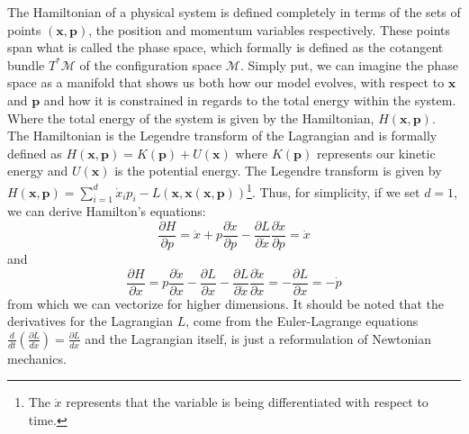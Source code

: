 \documentclass[twoside]{article}
\begin{document}
The Hamiltonian of a physical system is defined completely in terms of the sets of points $(\textbf{x}, \textbf{p})$, the position and momentum variables respectively. These points span what is called the phase space, which formally is defined as the cotangent bundle $T^{*}\mathcal{M}$ of the configuration space $\mathcal{M}$. Simply put, we can imagine the phase space as a manifold that shows us both how our model evolves, with respect to $\textbf{x}$ and $\textbf{p}$ and how it is constrained in regards to the total energy within the system. Where the total energy of the system is given by the Hamiltonian, $H(\textbf{x},\textbf{p})$. The Hamiltonian is the Legendre transform of the Lagrangian and is formally defined as $
H(\textbf{x}, \textbf{p})  = K(\textbf{p}) + U(\textbf{x})$ where $K(\textbf{p})$ represents our kinetic energy and $U(\textbf{x})$ is the potential energy. The Legendre transform is given by $H(\textbf{x},\textbf{p}) = \sum_{i = 1}^{d}\dot{x}_{i}p_{i} - L(\textbf{x}, \textbf{\.{x}}(\textbf{x}, \textbf{p})) $\footnote{The $\dot{x}$ represents that the variable is being differentiated with respect to time.}.  
Thus, for simplicity, if we set $d = 1$, we can derive Hamilton's equations: 
\begin{equation}
\label{eq:hameq1}
\frac{\partial H}{\partial p} = \dot{x} + p\frac{\partial \dot{x}}{\partial p} - \frac{\partial L}{\partial \dot{x}}\frac{\partial \dot{x}}{\partial p} = \dot{x} 
\end{equation}
and 
\begin{equation}
\label{eq:hameq2}
\frac{\partial H}{\partial x} = p\frac{\partial \dot{x}}{\partial x} - \frac{\partial L}{\partial x} - \frac{\partial L}{\partial \dot{x}}\frac{\partial \dot{x}}{\partial x} = - \frac{\partial L}{\partial x}= -\dot{p}  
\end{equation}
from which we can vectorize for higher dimensions. It should be noted that the derivatives for the Lagrangian $L$, come from the Euler-Lagrange equations $\frac{d}{dt}\left(\frac{\partial L}{d\dot{x}}\right) = \frac{\partial L}{dx}$ and the Lagrangian itself, is just a reformulation of Newtonian mechanics.
\end{document}
